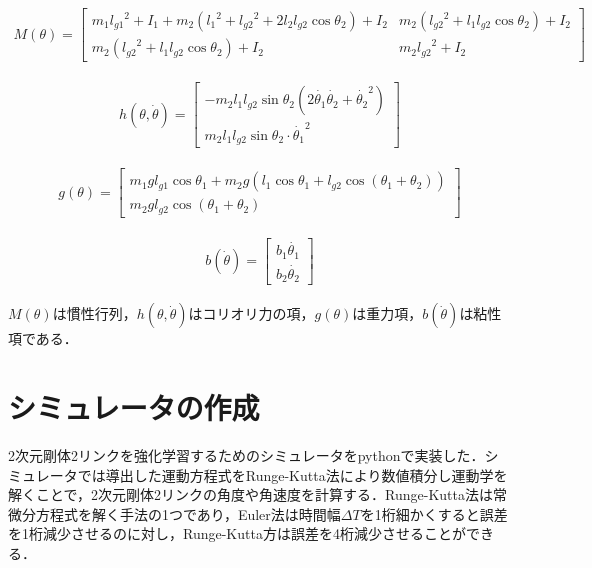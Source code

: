 \begin{align}
  M(\theta)= 
            \begin{bmatrix}
              m_{1}{l_{g1}}^2 + I_{1} + m_{2}({l_{1}}^2 + {l_{g2}}^2 + 2l_{2}l_{g2}\cos\theta_{2}) + I_{2} & m_{2}({l_{g2}}^2 + l_{1}l_{g2}\cos\theta_{2}) + I_{2} \\
              m_{2}({l_{g2}}^2 + l_{1}l_{g2}\cos\theta_{2}) + I_{2} & m_{2}{l_{g2}}^2 + I_{2}
            \end{bmatrix}
\end{align}

\begin{eqnarray}
  h(\theta, \dot{\theta})=
            \begin{bmatrix}
              -m_{2}l_{1}l_{g2}\sin\theta_{2}(2\dot{\theta_{1}}\dot{\theta_{2}} + {\dot{\theta_{2}}}^2) \\
              m_{2}l_{1}l_{g2}\sin\theta_{2}\cdot{\dot{\theta_{1}}}^2
            \end{bmatrix}
\end{eqnarray}

\begin{eqnarray}
  g(\theta)=
            \begin{bmatrix}
              m_{1}gl_{g1}\cos\theta_{1} + m_{2}g(l_{1}\cos\theta_{1} + l_{g2}\cos(\theta_{1} + \theta_{2})) \\
              m_{2}gl_{g2}\cos(\theta_{1} + \theta_{2})
            \end{bmatrix}
\end{eqnarray}

\begin{eqnarray}
  b(\dot{\theta})=
            \begin{bmatrix}
              b_{1}\dot{\theta_{1}} \\
              b_{2}\dot{\theta_{2}}
            \end{bmatrix}
\end{eqnarray}

$M(\theta)$は慣性行列，$h(\theta, \dot{\theta})$はコリオリ力の項，$g(\theta)$は重力項，$b(\dot{\theta})$は粘性項である．

\section{シミュレータの作成}
2次元剛体2リンクを強化学習するためのシミュレータをpythonで実装した．シミュレータでは導出した運動方程式をRunge-Kutta法\cite{runge-kutta}により数値積分し運動学を解くことで，2次元剛体2リンクの角度や角速度を計算する．Runge-Kutta法は常微分方程式を解く手法の1つであり，Euler法は時間幅$\Delta T$を1桁細かくすると誤差を1桁減少させるのに対し，Runge-Kutta方は誤差を4桁減少させることができる．
